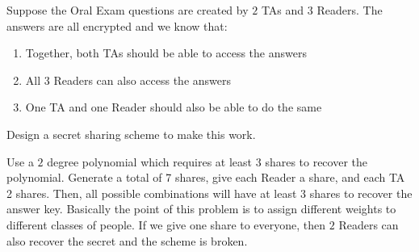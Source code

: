 \question Suppose the Oral Exam questions are created by $2$ TAs 
and $3$ Readers. The answers are all encrypted and we know that:

\begin{enumerate}[label=(\alph*)]
\item Together, both TAs should be able to access the answers
\item All 3 Readers can also access the answers
\item One TA and one Reader should also be able to do the same
\end{enumerate}

Design a secret sharing scheme to make this work.

\begin{solution}
Use a $2$ degree polynomial which requires at least $3$ shares to 
recover the polynomial. Generate a total of 7 shares, give each Reader 
a share, and each TA 2 shares. Then, all possible combinations will 
have at least $3$ shares to recover the answer key. Basically the point 
of this problem is to assign different weights to different classes of 
people. If we give one share to everyone, then $2$ Readers can also 
recover the secret and the scheme is broken.
\end{solution}

\clearpage